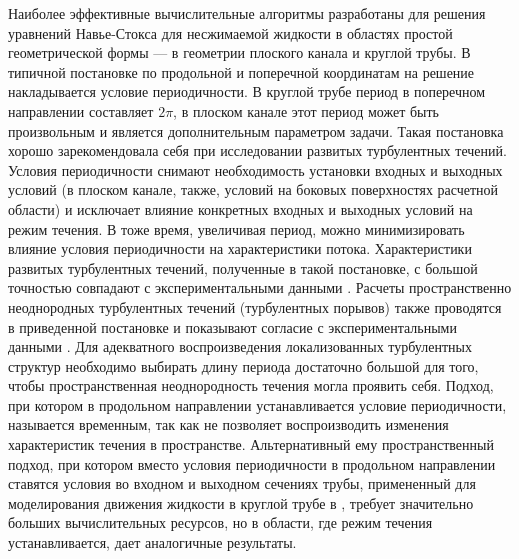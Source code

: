 Наиболее эффективные вычислительные алгоритмы разработаны для решения уравнений Навье-Стокса для несжимаемой жидкости в областях простой геометрической формы --- в геометрии плоского канала и круглой трубы. В типичной постановке по продольной и поперечной координатам на решение накладывается условие периодичности. В круглой трубе период в поперечном направлении составляет $2\pi$, в плоском канале этот период может быть произвольным и является дополнительным параметром задачи. Такая постановка хорошо зарекомендовала себя при исследовании развитых турбулентных течений. Условия периодичности снимают необходимость установки входных и выходных условий (в плоском канале, также, условий на боковых поверхностях расчетной области) и исключает влияние конкретных входных и выходных условий на режим течения. В тоже время, увеличивая период, можно минимизировать влияние условия периодичности на характеристики потока. Характеристики развитых турбулентных течений, полученные в такой постановке, с большой точностью совпадают с экспериментальными данными \cite{Kim1987, Eggels1994, Nikitin1996}. Расчеты пространственно неоднородных турбулентных течений (турбулентных порывов) также проводятся в приведенной постановке и показывают согласие с экспериментальными данными \cite{Priymak2004, Avila2010, Song2017}. Для адекватного воспроизведения локализованных турбулентных структур необходимо выбирать длину периода достаточно большой для того, чтобы пространственная неоднородность течения могла проявить себя. Подход, при котором в продольном направлении устанавливается условие периодичности, называется временным, так как не позволяет воспроизводить изменения характеристик течения в пространстве. Альтернативный ему пространственный подход, при котором вместо условия периодичности в продольном направлении ставятся условия во входном и выходном сечениях трубы, примененный для моделирования движения жидкости в круглой трубе в \cite{Nikitin1995}, требует значительно больших вычислительных ресурсов, но в области, где режим течения устанавливается, дает аналогичные результаты. 

